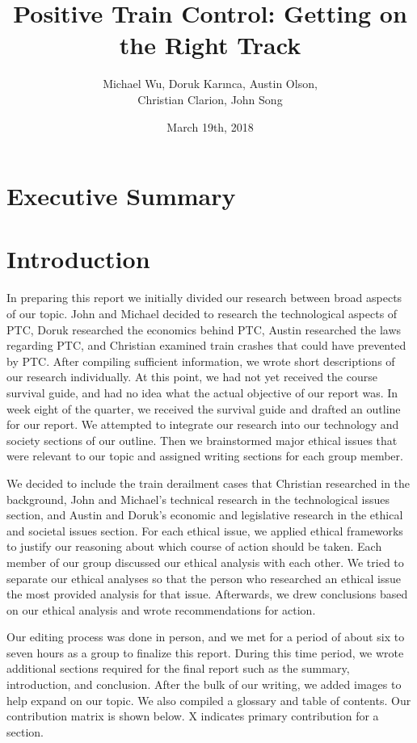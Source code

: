 \documentclass[11pt, titlepage]{article}
\title{Positive Train Control: Getting on the Right Track}
\author{Michael Wu, Doruk Karınca, Austin Olson,\\Christian Clarion, John Song}
\date{March 19th, 2018}
\newcommand\frontmatter{
    \cleardoublepage
  \pagenumbering{roman}}
\newcommand\mainmatter{
    \cleardoublepage
  \pagenumbering{arabic}}
\begin{document}
\maketitle

\frontmatter
\tableofcontents
\listoffigures
\listoftables

\mainmatter
\section{Executive Summary}

\pagebreak

\section{Introduction}

In preparing this report we initially divided our research between broad aspects of our topic. John and Michael decided to research the technological aspects of PTC, Doruk researched the economics behind PTC, Austin researched the laws regarding PTC, and Christian examined train crashes that could have prevented by PTC. After compiling sufficient information, we wrote short descriptions of our research individually. At this point, we had not yet received the course survival guide, and had no idea what the actual objective of our report was. In week eight of the quarter, we received the survival guide and drafted an outline for our report. We attempted to integrate our research into our technology and society sections of our outline. Then we brainstormed major ethical issues that were relevant to our topic and assigned writing sections for each group member.

We decided to include the train derailment cases that Christian researched in the background, John and Michael’s technical research in the technological issues section, and Austin and Doruk’s economic and legislative research in the ethical and societal issues section. For each ethical issue, we applied ethical frameworks to justify our reasoning about which course of action should be taken. Each member of our group discussed our ethical analysis with each other. We tried to separate our ethical analyses so that the person who researched an ethical issue the most provided analysis for that issue. Afterwards, we drew conclusions based on our ethical analysis and wrote recommendations for action.

Our editing process was done in person, and we met for a period of about six to seven hours as a group to finalize this report. During this time period, we wrote additional sections required for the final report such as the summary, introduction, and conclusion. After the bulk of our writing, we added images to help expand on our topic. We also compiled a glossary and table of contents. Our contribution matrix is shown below. X indicates primary contribution for a section.
\end{document}
